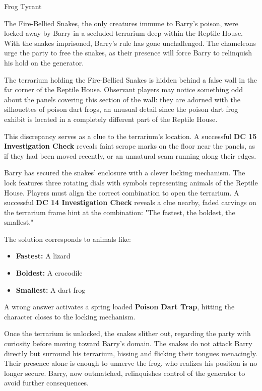 \begin{DndQuestHook}[width=0.5\textwidth - 4pt]{Frog Tyrant}
	\DndQuestHookBasics[
		location = {Reptile House},
		quest-giver = {Chameleons},
		objective = {Put an end to Barry's tyranny},
	]
	
	{\noindent\entryfont The Fire-Bellied Snakes, the only creatures immune to Barry's poison, were locked away by Barry in a secluded terrarium deep within the Reptile House. With the snakes imprisoned, Barry's rule has gone unchallenged. The chameleons urge the party to free the snakes, as their presence will force Barry to relinquish his hold on the generator.
	
	The terrarium holding the Fire-Bellied Snakes is hidden behind a false wall in the far corner of the Reptile House. Observant players may notice something odd about the panels covering this section of the wall: they are adorned with the silhouettes of poison dart frogs, an unusual detail since the poison dart frog exhibit is located in a completely different part of the Reptile House.

	This discrepancy serves as a clue to the terrarium's location. A successful \textbf{DC 15 Investigation Check} reveals faint scrape marks on the floor near the panels, as if they had been moved recently, or an unnatural seam running along their edges.
	
	Barry has secured the snakes' enclosure with a clever locking mechanism. The lock features three rotating dials with symbols representing animals of the Reptile House. Players must align the correct combination to open the terrarium. A successful \textbf{DC 14 Investigation Check} reveals a clue nearby, faded carvings on the terrarium frame hint at the combination: "The fastest, the boldest, the smallest."
	
	\noindent The solution corresponds to animals like:
	\begin{itemize}
		\item \textbf{Fastest:} A lizard
		\item \textbf{Boldest:} A crocodile
		\item \textbf{Smallest:} A dart frog
	\end{itemize}
	\noindent A wrong answer activates a spring loaded \textbf{Poison Dart Trap}, hitting the character closes to the locking mechanism.
	
	Once the terrarium is unlocked, the snakes slither out, regarding the party with curiosity before moving toward Barry's domain. The snakes do not attack Barry directly but surround his terrarium, hissing and flicking their tongues menacingly. Their presence alone is enough to unnerve the frog, who realizes his position is no longer secure. Barry, now outmatched, relinquishes control of the generator to avoid further consequences.}
	

\end{DndQuestHook}
